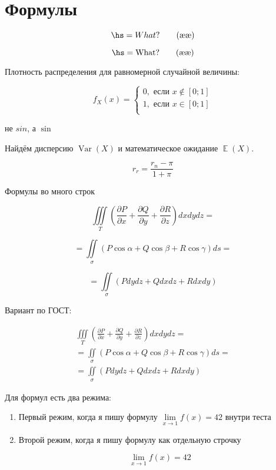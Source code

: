 \documentclass[12pt, a4paper]{article}
\DeclareMathOperator{\Var}{Var}
\DeclareMathOperator{\E}{\mathbb E}
\begin{document}
\section{Формулы} 

\begin{equation}\label{eqn:b}
    \hs = What? \tag{\ae\ae}
\end{equation}

\begin{equation}\label{eqn:b}
    \hs = \text{What?} \tag{\ae\ae}
\end{equation}

Плотность распределения для равномерной случайной величины: 

\begin{equation}
    f_X(x) = \begin{cases} 
    0, \text{ если } x \notin [0;1] \\ 
    1, \text{ если } x \in [0;1] \\ 
    \end{cases} 
\end{equation}


не $sin$, а $\sin$

Найдём дисперсию $\Var(X)$ и математическое ожидание $\E(X)$.


\begin{equation*}
   r_r = \frac{r_n - \pi}{1 + \pi}
\end{equation*}

Формулы во много строк 

$$ \iiint\limits_{T} (\frac{\partial P}{\partial x} + \frac{\partial Q}{\partial y} + \frac{\partial R}{\partial z})dxdydz = $$

$$ = \iint\limits_{\sigma}(P\cos{\alpha} + Q\cos{\beta} + R\cos{\gamma})ds = $$

$$ = \iint\limits_{\sigma}(Pdydz + Qdxdz + Rdxdy)$$

Вариант по ГОСТ: 

 \begin{multline*}
    \iiint\limits_{T} (\frac{\partial P}{\partial x} + \frac{\partial Q}{\partial y} + \frac{\partial R}{\partial z})dxdydz = \\  = \iint\limits_{\sigma}(P\cos{\alpha} + Q\cos{\beta} + R\cos{\gamma})ds = \\ = \iint\limits_{\sigma}(Pdydz + Qdxdz + Rdxdy)
\end{multline*}

Для формул есть два режима:  

\begin{enumerate}
    \item Первый режим, когда я пишу формулу $\lim\limits_{x\to 1} f(x) = 42$ внутри теста 
    
    \item Второй режим, когда я пишу формулу как отдельную строчку 
    
    $$
    \lim_{x\to 1} f(x) = 42
    $$
\end{enumerate}
\end{document}
